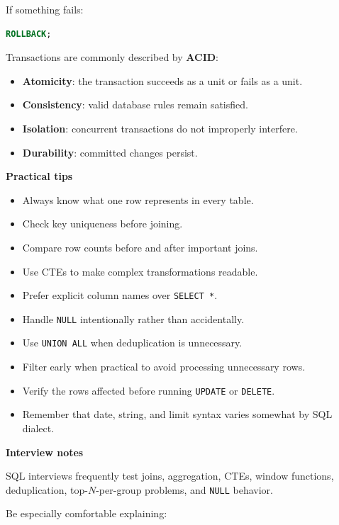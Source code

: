 \documentclass[11pt,letterpaper]{article}
\begin{document}
If something fails:

\begin{lstlisting}[language=SQL]
ROLLBACK;
\end{lstlisting}

Transactions are commonly described by \textbf{ACID}:

\begin{itemize}[leftmargin=*]
    \item \textbf{Atomicity}: the transaction succeeds as a unit or fails as a unit.
    \item \textbf{Consistency}: valid database rules remain satisfied.
    \item \textbf{Isolation}: concurrent transactions do not improperly interfere.
    \item \textbf{Durability}: committed changes persist.
\end{itemize}

\textbf{Practical tips}

\begin{itemize}[leftmargin=*]
    \item Always know what one row represents in every table.
    \item Check key uniqueness before joining.
    \item Compare row counts before and after important joins.
    \item Use CTEs to make complex transformations readable.
    \item Prefer explicit column names over \texttt{SELECT *}.
    \item Handle \texttt{NULL} intentionally rather than accidentally.
    \item Use \texttt{UNION ALL} when deduplication is unnecessary.
    \item Filter early when practical to avoid processing unnecessary rows.
    \item Verify the rows affected before running \texttt{UPDATE} or \texttt{DELETE}.
    \item Remember that date, string, and limit syntax varies somewhat by SQL dialect.
\end{itemize}

\textbf{Interview notes}

SQL interviews frequently test joins, aggregation, CTEs, window functions,
deduplication, top-$N$-per-group problems, and \texttt{NULL} behavior.

Be especially comfortable explaining:
\end{document}
